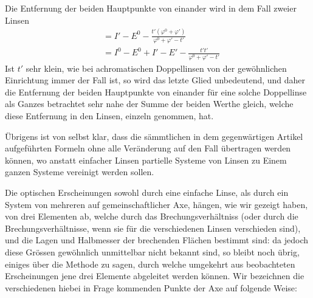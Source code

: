 Die Entfernung der beiden Hauptpunkte von einander wird in dem Fall zweier Linsen
\[
\begin{aligned}
&=I'-E^0-\frac{t'(\varphi^0+\varphi')}{\varphi^0+\varphi'-t'}\\
&=I^0-E^0+I'-E'-\frac{t't'}{\varphi^0+\varphi'-t'}
\end{aligned}
\]
Ist $t'$ sehr klein, wie bei achromatischen Doppellinsen von der gewöhnlichen Einrichtung immer der Fall ist, so wird das letzte Glied unbedeutend, und daher die Entfernung der beiden Hauptpunkte von einander für eine solche Doppellinse als Ganzes betrachtet sehr nahe der Summe der beiden Werthe gleich, welche diese Entfernung in den Linsen, einzeln genommen, hat.

Übrigens ist von selbst klar, dass die sämmtlichen in dem gegenwärtigen Artikel aufgeführten Formeln ohne alle Veränderung auf den Fall übertragen werden können, wo anstatt einfacher Linsen partielle Systeme von Linsen zu Einem ganzen Systeme vereinigt werden sollen.

Die optischen Erscheinungen sowohl durch eine einfache Linse, als durch ein System von mehreren auf gemeinschaftlicher Axe, hängen, wie wir gezeigt haben, von drei Elementen ab, welche durch das Brechungsverhältniss (oder durch die Brechungsverhältnisse, wenn sie für die verschiedenen Linsen verschieden sind), und die Lagen und Halbmesser der brechenden Flächen bestimmt sind: da jedoch diese Grössen gewöhnlich unmittelbar nicht bekannt sind, so bleibt noch übrig, einiges über die Methode zu sagen, durch welche umgekehrt aus beobachteten Erscheinungen jene drei Elemente abgeleitet werden können. Wir bezeichnen die verschiedenen hiebei in Frage kommenden Punkte der Axe auf folgende Weise:
